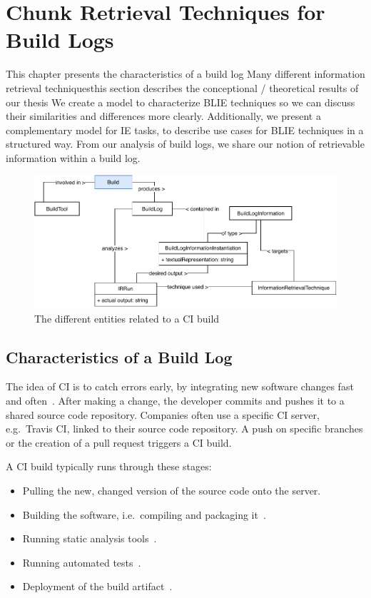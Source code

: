 \documentclass[\myrootdir/main.tex]{subfiles}
\begin{document}
\chapter{Chunk Retrieval Techniques for Build Logs}
\label{sec:techniques}
This chapter presents the characteristics of a build log
Many different information retrieval techniques\textellipsis this section describes the conceptional / theoretical results of our thesis\textellipsis
We create a model to characterize BLIE techniques so we can discuss their similarities and differences more clearly.
Additionally, we present a complementary model for IE tasks, to describe use cases for BLIE techniques in a structured way.
From our analysis of build logs, we share our notion of retrievable information within a build log.

\begin{figure}[htbp]
	\centering
	\includegraphics[width=\textwidth, clip]{img/build-overview.pdf}
	\caption{The different entities related to a CI build}
	\label{fig:build-overview}
\end{figure}

\section{Characteristics of a Build Log}
\label{sec:bl-characteristics}
The idea of CI is to catch errors early, by integrating new software changes fast and often~\cite{humble2010continuous}.
After making a change, the developer commits and pushes it to a shared source code repository.
Companies often use a specific CI server, e.g.\ Travis CI, linked to their source code repository.
A push on specific branches or the creation of a pull request triggers a CI build.

A CI build typically runs through these stages:
\begin{itemize}
	\item Pulling the new, changed version of the source code onto the server.
	\item Building the software, i.e.\ compiling and packaging it~\cite{phillips2014understanding}.
	\item Running static analysis tools~\cite{zampetti2017open}.
	\item Running automated tests~\cite{beller2017oops}.
	\item Deployment of the build artifact~\cite{schermann2016empirical}.
\end{itemize}
\end{document}
